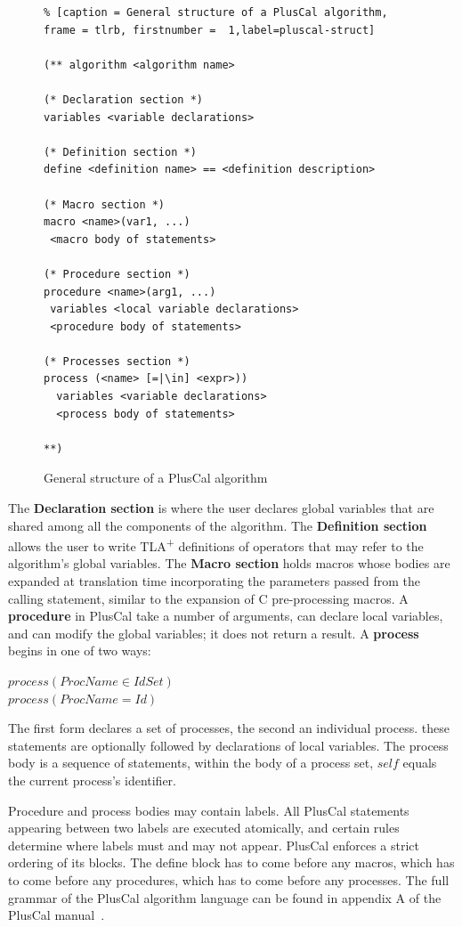 \documentclass{thesul}
\newcommand{\tlaplus}{TLA\textsuperscript{+}\xspace}
\begin{document}
\begin{figure}[!h]
\begin{lstlisting}% [caption = General structure of a PlusCal algorithm, frame = tlrb, firstnumber =  1,label=pluscal-struct]

(** algorithm <algorithm name>

(* Declaration section *)
variables <variable declarations>

(* Definition section *)
define <definition name> == <definition description>

(* Macro section *)
macro <name>(var1, ...)
 <macro body of statements>

(* Procedure section *)
procedure <name>(arg1, ...)
 variables <local variable declarations>
 <procedure body of statements>

(* Processes section *)
process (<name> [=|\in] <expr>))
  variables <variable declarations>
  <process body of statements>

**)

\end{lstlisting}
\caption{General structure of a PlusCal algorithm}
\label{pluscal-struct}
\end{figure}

The \textbf{Declaration section} is where the user declares global variables that are shared among all the components of the algorithm. The \textbf{Definition section} allows the user to write \tlaplus definitions of operators that may refer to the algorithm's global variables.
The \textbf{Macro section} holds macros whose bodies are expanded at translation time incorporating the parameters passed from the calling statement, similar to the expansion of C pre-processing macros. A \textbf{procedure} in PlusCal take a number of arguments, can declare local variables, and can modify the global variables; it does not return a result. A \textbf{process} begins in one of two ways: 
\begin{center}
$process (ProcName \in IdSet)$ \\
$process (ProcName = Id)$
\end{center}

The first form declares a set of processes, the second an individual process. these statements are optionally followed by declarations of local variables. The process body is a sequence of statements, within the body of a process set, $self$ equals the current process's identifier.

Procedure and process bodies may contain labels. All PlusCal statements appearing between two labels are executed atomically, and certain rules determine where labels must and may not appear.
PlusCal enforces a strict ordering of its blocks. The define block has to come before any macros, which has to come before any procedures, which has to come before any processes. The full grammar of the PlusCal algorithm language can be found in appendix A of the PlusCal manual~\cite{pcalAlgo}.
\end{document}
